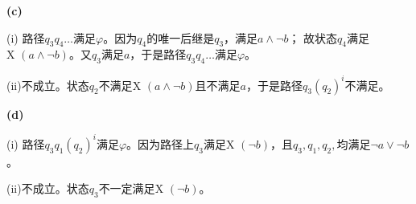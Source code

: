 \begin{solution}
    \textbf{(c)}
    
    (i) 路径$q_3q_4\ldots$满足$\varphi$。因为$q_4$的唯一后继是$q_3$，满足$a\wedge \neg b$；
        故状态$q_4$满足$\textrm{X }(a\wedge \neg b)$。又$q_3$满足$a$，于是路径$q_3q_4\ldots$满足$\varphi$。

    (ii)不成立。状态$q_2$不满足$\textrm{X }(a\wedge \neg b)$且不满足$a$，于是路径$q_3(q_2)^i$不满足。

    \textbf{(d)}
   
    (i) 路径$q_3q_1(q_2)^i$满足$\varphi$。因为路径上$q_3$满足$\textrm{X }(\neg b)$，且$q_3,q_1,q_2,$均满足$\neg a\vee \neg b$。

    (ii)不成立。状态$q_3$不一定满足$\textrm{X }(\neg b)$。

\end{solution}